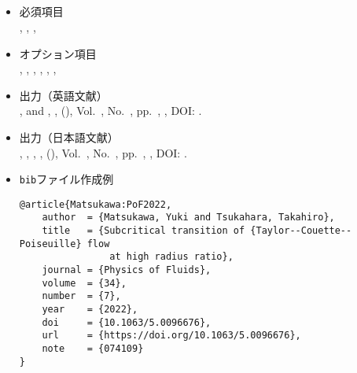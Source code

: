 \documentclass[a4paper,fleqn,uplatex,dvipdfmx]{jsarticle}
\begin{document}
\subsection{\ttarticle}
\label{ssec:article}
\begin{tcolorbox}[enhanced, title=\ttarticle, drop fuzzy shadow]
    \begin{itemize}
        \item 必須項目 \\
        \ttauthor, \tttitle, \ttjournal, \ttyear
        \item オプション項目 \\
        \ttvolume, \ttnumber, \ttpages, \ttmonth, \ttnote, \ttkey, \ttdoi
        \item 出力（英語文献） \\
            \colorbox[gray]{0.8}{\ttauthorf}, \colorbox[gray]{0.8}{\ttauthors} and \colorbox[gray]{0.8}{\ttauthort}, \colorbox[gray]{0.8}{\tttitle}, \colorbox[gray]{0.8}{\ttjournal} (\colorbox[gray]{0.8}{\ttyear}), Vol.~\colorbox[gray]{0.8}{\ttvolume}, No.~\colorbox[gray]{0.8}{\ttnumber}, pp.~\colorbox[gray]{0.8}{\ttpages}, \colorbox[gray]{0.8}{\ttnote}, DOI: \colorbox[gray]{0.8}{\ttdoi}.
        \item 出力（日本語文献） \\
            \colorbox[gray]{0.8}{\ttauthorf}, \colorbox[gray]{0.8}{\ttauthors}, \colorbox[gray]{0.8}{\ttauthort}, \colorbox[gray]{0.8}{\tttitle}, \colorbox[gray]{0.8}{\ttjournal} (\colorbox[gray]{0.8}{\ttyear}), Vol.~\colorbox[gray]{0.8}{\ttvolume}, No.~\colorbox[gray]{0.8}{\ttnumber}, pp.~\colorbox[gray]{0.8}{\ttpages}, \colorbox[gray]{0.8}{\ttnote}, DOI: \colorbox[gray]{0.8}{\ttdoi}.
        \item \verb|bib|ファイル作成例 \vspace{-3mm}
\begin{verbatim}
@article{Matsukawa:PoF2022,
    author  = {Matsukawa, Yuki and Tsukahara, Takahiro},
    title   = {Subcritical transition of {Taylor--Couette--Poiseuille} flow 
                at high radius ratio},
    journal = {Physics of Fluids},
    volume  = {34},
    number  = {7},
    year    = {2022},
    doi     = {10.1063/5.0096676},
    url     = {https://doi.org/10.1063/5.0096676},
    note    = {074109}
}
\end{verbatim}
    \end{itemize}
\end{tcolorbox}
\end{document}
